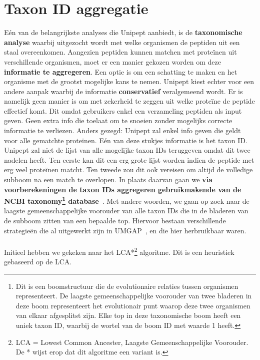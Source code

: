 \section{Taxon ID aggregatie}\label{sec:taxon-id-aggregatie}
Eén van de belangrijkste analyses die Unipept aanbiedt, is de \textbf{taxonomische analyse} waarbij uitgezocht wordt met welke organismen de peptiden uit een staal overeenkomen.
Aangezien peptiden kunnen matchen met proteïnen uit verschillende organismen, moet er een manier gekozen worden om deze \textbf{informatie te aggregeren}.
Een optie is om een schatting te maken en het organisme met de grootst mogelijke kans te nemen.
Unipept kiest echter voor een andere aanpak waarbij de informatie \textbf{conservatief} veralgemeend wordt.
Er is namelijk geen manier is om met zekerheid te zeggen uit welke proteïne de peptide effectief komt.
Dit omdat gebruikers enkel een verzameling peptiden als input geven.
Geen extra info die toelaat om te snoeien zonder mogelijks correcte informatie te verliezen.
Anders gezegd: Unipept zal enkel info geven die geldt voor alle gematchte proteïnen.
Eén van deze stukjes informatie is het taxon ID\@.
Unipept zal niet de lijst van alle mogelijke taxon IDs teruggeven omdat dit twee nadelen heeft.
Ten eerste kan dit een erg grote lijst worden indien de peptide met erg veel proteïnen matcht.
Ten tweede zou dit ook vereisen om altijd de volledige subboom na een match te overlopen.
In plaats daarvan gaan we \textbf{via voorberekeningen de taxon IDs aggregeren gebruikmakende van de NCBI taxonomy\footnote{Dit is een boomstructuur die de evolutionaire relaties tussen organismen representeert. De laagste gemeenschappelijke voorouder van twee bladeren in deze boom representeert het evolutionair punt waarop deze twee organismen van elkaar afgesplitst zijn. Elke top in deze taxonomische boom heeft een uniek taxon ID, waarbij de wortel van de boom ID met waarde 1 heeft.} database}~\cite{NCBI_original_article, NCBI_update}.
Met andere woorden, we gaan op zoek naar de laagste gemeenschappelijke voorouder van alle taxon IDs die in de bladeren van de subboom zitten van een bepaalde top.
Hiervoor bestaan verschillende strategieën die al uitgewerkt zijn in UMGAP~\cite{UMGAP_paper, UMGAP_source}, en die hier herbruikbaar waren.
\\ \\
Initieel hebben we gekeken naar het LCA*\footnote{LCA = Lowest Common Ancester, Laagste Gemeenschappelijke Voorouder. De * wijst erop dat dit algoritme een variant is.} algoritme.
Dit is een heuristiek gebaseerd op de LCA.
